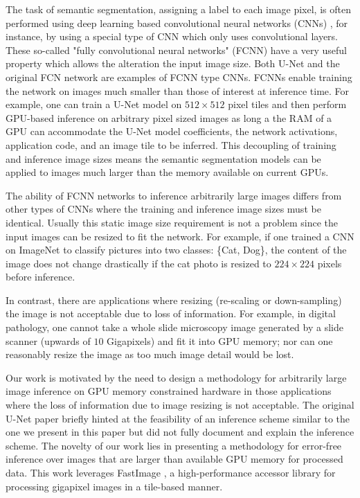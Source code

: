 \documentclass[runningheads]{llncs}
\begin{document}
The task of semantic segmentation, assigning a label to each image pixel, is often performed using deep learning based convolutional neural networks (CNNs) \cite{Badrinarayanan2015a,Ronneberger2015a}, for instance, by using a special type of CNN which only uses convolutional layers.
These so-called "fully convolutional neural networks" (FCNN) have a very useful property which allows the alteration the input image size. 
Both U-Net \cite{Ronneberger2015a} and the original FCN network \cite{Long2015} are examples of FCNN type CNNs. 
FCNNs enable training the network on images much smaller than those of interest at inference time. 
For example, one can train a U-Net model on $512 \times 512$ pixel tiles and then perform GPU-based inference on arbitrary pixel sized images as long a the RAM of a GPU can accommodate the U-Net model coefficients, the network activations, application code, and an image tile to be inferred. This decoupling of training and inference image sizes means the semantic segmentation models can be applied to images much larger than the memory available on current GPUs. 

The ability of FCNN networks to inference arbitrarily large images differs from other types of CNNs where the training and inference image sizes must be identical. Usually this static image size requirement is not a problem since the input images can be resized to fit the network. For example, if one trained a CNN on ImageNet \cite{Russakovsky2015} to classify pictures into two classes: \{Cat, Dog\}, the content of the image does not change drastically if the cat photo is resized to $224 \times 224$ pixels before inference.


In contrast, there are applications where resizing (re-scaling or down-sampling) the image is not acceptable due to loss of information. For example, in digital pathology, one cannot take a whole slide microscopy image generated by a slide scanner (upwards of $\num{10}$ Gigapixels) and fit it into GPU memory; nor can one reasonably resize the image as too much image detail would be lost. 

Our work is motivated by the need to design a methodology for arbitrarily large image inference on GPU memory constrained hardware in those applications where the loss of information due to image resizing is not acceptable. The original U-Net paper \cite{Ronneberger2015a} briefly hinted at the feasibility of an inference scheme similar to the one we present in this paper but did not fully document and explain the inference scheme. 
The novelty of our work lies in presenting a methodology for error-free inference over images that are larger than available GPU memory for processed data. This work leverages FastImage \cite{Bardakoff2019}, a high-performance accessor library for processing gigapixel images in a tile-based manner.
\end{document}
